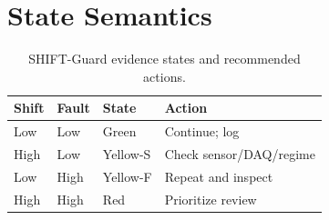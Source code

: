 \documentclass{article}
\begin{document}
\section{State Semantics}

\begin{table}[h]
\caption{SHIFT-Guard evidence states and recommended actions.}
\centering
\small
\begin{tabular}{llll}
\toprule
Shift & Fault & State & Action \\
\midrule
Low & Low & Green & Continue; log \\
High & Low & Yellow-S & Check sensor/DAQ/regime \\
Low & High & Yellow-F & Repeat and inspect \\
High & High & Red & Prioritize review \\
\bottomrule
\end{tabular}
\end{table}
\end{document}
